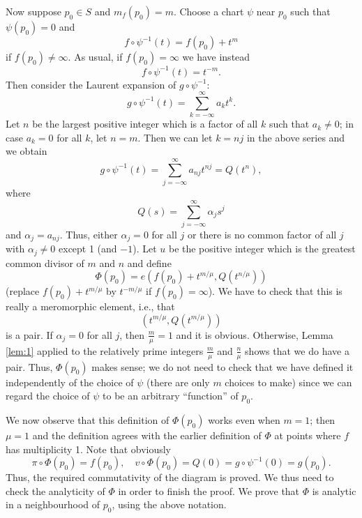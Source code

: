 \documentclass[a4paper,11pt]{article}
\begin{document}
\begin{myproof}
  Now suppose $p_0 \in S$ and $m_f(p_0) = m$.  Choose a chart $\psi$
  near $p_0$ such that $\psi(p_0) = 0$ and
  $$
  f \circ \psi^{-1}(t) = f(p_0) + t^m
  $$
  if $f(p_0) \ne \infty$.  As usual, if $f(p_0) = \infty$ we have
  instead
  $$
  f \circ \psi^{-1}(t) = t^{-m}.
  $$
  Then consider the Laurent expansion of $g \circ \psi^{-1}$:
  $$
  g \circ \psi^{-1}(t) = \sum_{k=-\infty}^{\infty} a_k t^k.
  $$
  Let $n$ be the largest positive integer which is a factor of all $k$
  such that $a_k \ne 0$; in case $a_k = 0$ for all $k$, let $n=m$.
  Then we can let $k = nj$ in the above series and we obtain
  $$
  g \circ \psi^{-1}(t) = \sum_{j=-\infty}^{\infty} a_{nj} t^{nj} = Q(t^n),
  $$
  where
  $$
  Q(s) = \sum_{j=-\infty}^{\infty} \alpha_j s^j
  $$
  and $\alpha_j = a_{nj}$.  Thus, either $\alpha_j = 0$ for all $j$ or
  there is no common factor of all $j$ with $\alpha_j \ne 0$ except 1
  (and $-1$).  Let $u$ be the positive integer which is the greatest
  common divisor of $m$ and $n$ and define
  $$
  \Phi(p_0) = e(f(p_0) + t^{m/\mu}, Q(t^{n/\mu}))
  $$
  (replace $f(p_0) + t^{m/\mu}$ by $t^{-m/\mu}$ if $f(p_0) =
  \infty$).  We have to check that this is really a meromorphic
  element, i.e., that
  $$
  (t^{m/\mu}, Q(t^{m/\mu}))
  $$
  is a pair.  If $\alpha_j = 0$ for all $j$, then $\frac{m}{\mu} = 1$
  and it is obvious.  Otherwise, Lemma \ref{lem:1} applied to the 
  relatively prime integers $\frac{m}{\mu}$ and $\frac{n}{\mu}$ shows 
  that we do have a pair.  Thus, $\Phi(p_0)$ makes sense; we do not 
  need to check that we have defined it independently of the choice of 
  $\psi$ (there are only $m$ choices to make) since we can regard the 
  choice of $\psi$ to be an arbitrary ``function'' of $p_0$.

  We now observe that this definition of $\Phi(p_0)$ works even when
  $m = 1$; then $\mu = 1$ and the definition agrees with the earlier
  definition of $\Phi$ at points where $f$ has multiplicity 1.  Note
  that obviously
  $$
  \pi \circ \Phi(p_0) = f(p_0),\quad
  v \circ \Phi(p_0) = Q(0) = g\circ \psi^{-1}(0) = g(p_0).
  $$
  Thus, the required commutativity of the diagram is proved.  We thus
  need to check the analyticity of $\Phi$ in order to finish the
  proof.  We prove that $\Phi$ is analytic in a neighbourhood of
  $p_0$, using the above notation.


\end{myproof}
\end{document}
